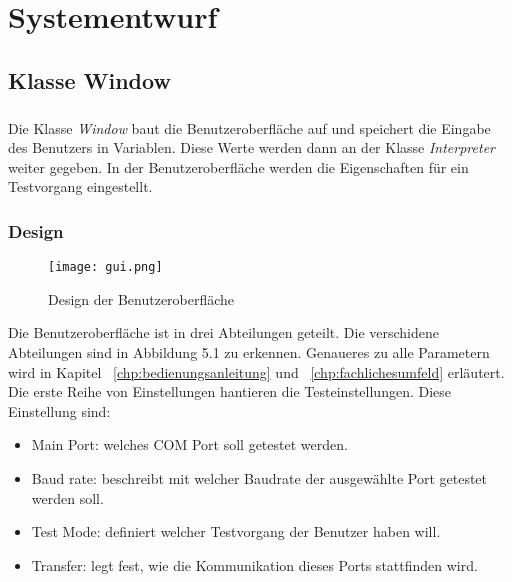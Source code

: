 \chapter{Systementwurf}\label{chp:systementwurf}

\section{Klasse Window}
\paragraph{}
Die Klasse \textit{Window} baut die Benutzeroberfläche auf und speichert die Eingabe des Benutzers in Variablen. Diese Werte werden dann an der Klasse \textit{Interpreter} weiter gegeben. In der Benutzeroberfläche werden die Eigenschaften für ein Testvorgang eingestellt.


\subsection{Design}
\begin{figure}[h]
  \begin{center}		%
    \texttt{[image: gui.png]}
  		  \caption{Design der Benutzeroberfläche}
     \label{fig.3pi-m3pi-Module}
  \end{center}
\end{figure}


Die Benutzeroberfläche ist in drei Abteilungen geteilt. Die verschidene Abteilungen sind in Abbildung 5.1 zu erkennen. Genaueres zu alle Parametern wird in Kapitel ~\ref{chp:bedienungsanleitung} und  ~\ref{chp:fachlichesumfeld} erläutert. Die erste Reihe von Einstellungen hantieren die Testeinstellungen. Diese Einstellung sind:
\begin{itemize}
\item Main Port: welches COM Port soll getestet werden.
\item Baud rate: beschreibt mit welcher Baudrate der ausgewählte Port getestet werden soll.
\item Test Mode: definiert welcher Testvorgang der Benutzer haben will.
\item Transfer: legt fest, wie die Kommunikation dieses Ports stattfinden wird.
\end{itemize}


